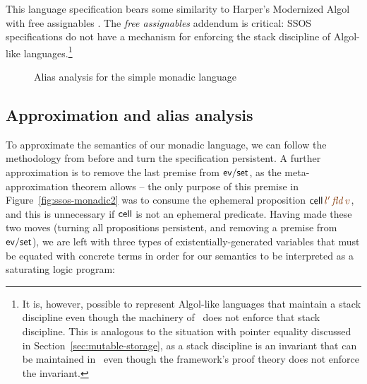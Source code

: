 This language specification bears some similarity to Harper's
Modernized Algol with free assignables \cite[Chapter
36]{harper12practical}. The {\it free assignables} addendum is
critical: SSOS specifications do not have a mechanism for enforcing
the stack discipline of Algol-like languages.\footnote{It is, however,
  possible to represent Algol-like languages that maintain a stack
  discipline even though the machinery of \sls~does not enforce that
  stack discipline. This is analogous to the situation with pointer
  equality discussed in Section~\ref{sec:mutable-storage}, as a stack
  discipline is an invariant that can be maintained in \sls~even
  though the framework's proof theory does not enforce the invariant.}

\begin{figure}
\caption{Alias analysis for the simple monadic language}
\label{fig:ssos-monadic-approx}
\end{figure}



\subsection{Approximation and alias analysis}


To approximate the semantics of our monadic language, we can follow the
methodology from before and turn the specification persistent. A further
approximation is to remove the last premise from ${\sf ev/set}$, as
the meta-approximation theorem allows -- the only purpose of this
premise in Figure~\ref{fig:ssos-monadic2} was to consume the ephemeral
proposition ${\sf cell}\,\lf{l'}\,\lf{\it fld}\,\lf{v}$, and this is unnecessary
if ${\sf cell}$ is not an ephemeral predicate.  Having
made these two moves (turning all propositions persistent, and removing
a premise from ${\sf ev/set}$), we are left with three types of
existentially-generated variables that must be equated with concrete
terms in order for our semantics to be interpreted as a saturating
logic program:

